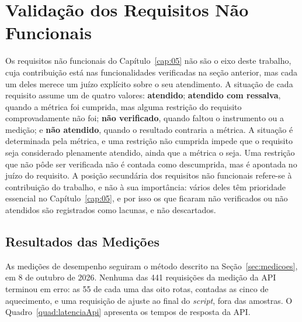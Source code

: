 \section{Validação dos Requisitos Não Funcionais}
\label{sec:validacaoRNF}

Os requisitos não funcionais do Capítulo~\ref{cap:05} não são o eixo deste trabalho, cuja contribuição está nas funcionalidades verificadas na seção anterior, mas cada um deles merece um juízo explícito sobre o seu atendimento. A situação de cada requisito assume um de quatro valores: \textbf{atendido}; \textbf{atendido com ressalva}, quando a métrica foi cumprida, mas alguma restrição do requisito comprovadamente não foi; \textbf{não verificado}, quando faltou o instrumento ou a medição; e \textbf{não atendido}, quando o resultado contraria a métrica. A situação é determinada pela métrica, e uma restrição não cumprida impede que o requisito seja considerado plenamente atendido, ainda que a métrica o seja. Uma restrição que não pôde ser verificada não é contada como descumprida, mas é apontada no juízo do requisito. A posição secundária dos requisitos não funcionais refere-se à contribuição do trabalho, e não à sua importância: vários deles têm prioridade essencial no Capítulo~\ref{cap:05}, e por isso os que ficaram não verificados ou não atendidos são registrados como lacunas, e não descartados.

\subsection{Resultados das Medições}

As medições de desempenho seguiram o método descrito na Seção~\ref{sec:medicoes}, em 8 de outubro de 2026. Nenhuma das 441 requisições da medição da API terminou em erro: as 55 de cada uma das oito rotas, contadas as cinco de aquecimento, e uma requisição de ajuste ao final do \textit{script}, fora das amostras. O Quadro~\ref{quad:latenciaApi} apresenta os tempos de resposta da API.

